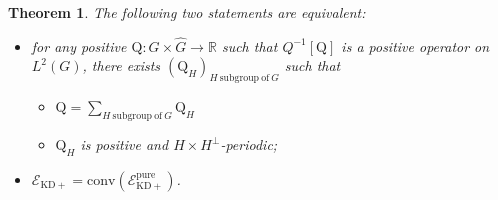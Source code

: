 \documentclass[a4paper, notitlepage, 11pt]{article}
\numberwithin{equation}{section}
\newcommand{\mcl}[1]{\ensuremath{\mathcal{#1}}}
\newcommand{\EcalKDC}{{\mcl E}_{\mathrm{KD+}}}
\newcommand{\EcalKDCpu}{{\mcl E}_{\mathrm{KD+}}^{\mathrm{pure}}}
\newcommand{\R}{\mathbb{R}}
\newcommand{\conv}[1]{\mathrm{conv}\left(#1\right)}
\newtheorem{Theorem}{Theorem}[section]
\begin{document}
\begin{Theorem}\label{thm:KDpositivestates}
    The following two statements are equivalent:
\begin{itemize}[leftmargin=*]
        \item for any positive $\mathrm{Q}:G\times \hat{G}\to \R$ such that $Q^{-1}[\mathrm{Q}]$ is a positive operator on $L^2(G)$, there exists $(\mathrm{Q}_{H})_{H \mathrm{ \ subgroup \ of \ } G}$ such that 
        \begin{itemize}
            \item $\mathrm{Q} = \sum_{H\mathrm{ \ subgroup \ of \ } G} \mathrm{Q}_{H}$
            \item $\mathrm{Q}_{H}$ is positive and $H\times H^{\perp}$-periodic;
        \end{itemize}
    \item $\EcalKDC = \conv{\EcalKDCpu}$.
\end{itemize}
\end{Theorem}
\end{document}
